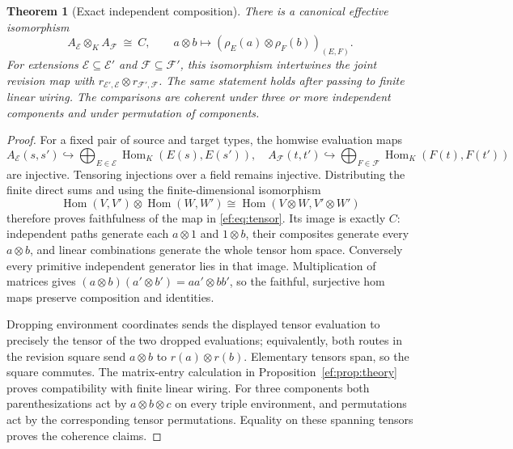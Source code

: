 \documentclass[11pt]{article}
\newtheorem{theorem}{Theorem}[section]
\theoremstyle{definition}
\theoremstyle{remark}\newtheorem{remark}[theorem]{Remark}
\begin{document}
\begin{theorem}[Exact independent composition]\label{ef:thm:tensor}
There is a canonical effective isomorphism
\begin{equation}\label{ef:eq:tensor}
 A_{\mathcal E}\otimes_K A_{\mathcal F}
       \ \cong\ C,
 \qquad a\otimes b\longmapsto
       (\rho_E(a)\otimes\rho_F(b))_{(E,F)}.
\end{equation}
For extensions $\mathcal E\subseteq\mathcal E'$ and
$\mathcal F\subseteq\mathcal F'$, this isomorphism intertwines the joint
revision map with $r_{\mathcal E',\mathcal E}\otimes
r_{\mathcal F',\mathcal F}$. The same statement holds after passing to
finite linear wiring. The comparisons are coherent under three or more
independent components and under permutation of components.
\end{theorem}
\begin{proof}
For a fixed pair of source and target types, the homwise evaluation maps
\[
 A_{\mathcal E}(s,s')\hookrightarrow
 \bigoplus_{E\in\mathcal E}\operatorname{Hom}_K(E(s),E(s')),
 \quad
 A_{\mathcal F}(t,t')\hookrightarrow
 \bigoplus_{F\in\mathcal F}\operatorname{Hom}_K(F(t),F(t'))
\]
are injective. Tensoring injections over a field remains injective.
Distributing the finite direct sums and using the finite-dimensional
isomorphism
\[
 \operatorname{Hom}(V,V')\otimes\operatorname{Hom}(W,W')
 \cong\operatorname{Hom}(V\otimes W,V'\otimes W')
\]
therefore proves faithfulness of the map in \eqref{ef:eq:tensor}.
Its image is exactly $C$: independent paths generate each $a\otimes1$
and $1\otimes b$, their composites generate every $a\otimes b$, and
linear combinations generate the whole tensor hom space. Conversely
every primitive independent generator lies in that image. Multiplication
of matrices gives
$(a\otimes b)(a'\otimes b')=aa'\otimes bb'$, so the faithful, surjective
hom maps preserve composition and identities.

Dropping environment coordinates sends the displayed tensor evaluation
to precisely the tensor of the two dropped evaluations; equivalently,
both routes in the revision square send $a\otimes b$ to
$r(a)\otimes r(b)$. Elementary tensors span, so the square commutes.
The matrix-entry calculation in Proposition~\ref{ef:prop:theory} proves
compatibility with finite linear wiring. For three components both
parenthesizations act by $a\otimes b\otimes c$ on every triple
environment, and permutations act by the corresponding tensor
permutations. Equality on these spanning tensors proves the coherence
claims.
\end{proof}
\end{document}
